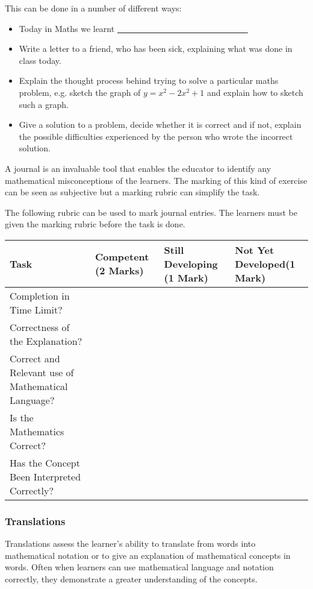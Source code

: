 This can be done in a number of different ways:
\begin{itemize}[noitemsep]
\item Today in Maths we learnt \underline{~~~~~~~~~~~~~~~~~~~~~~~~~~~~~~~} 
\item Write a letter to a friend, who has been sick, explaining what was done in class today.
\item Explain the thought process behind trying to solve a particular maths problem, e.g. sketch the graph of $ y = x^2 - 2x^2 + 1$ and explain how to sketch such a graph.
\item Give a solution to a problem, decide whether it is correct and if not, explain the possible difficulties experienced by the person who wrote the incorrect solution. 
\end{itemize}
A journal is an invaluable tool that enables the educator to identify any mathematical misconceptions of the learners. The marking of this kind of exercise can be seen as subjective but a marking rubric can simplify the task. 

The following rubric can be used to mark journal entries. The learners must be given the marking rubric before the task is done. 
\begin{table}[H]
 \begin{center}
  \begin{tabular}{|p{4cm}|p{2cm}|p{2.5cm}|p{3cm}|} \hline
  \textbf{Task} & \textbf{Competent \newline(2 Marks)} & \textbf{Still Developing \newline(1 Mark)}& \textbf{Not Yet Developed\newline (1 Mark)}\\ \hline
Completion in Time Limit? &&&\\ \hline
Correctness of the Explanation? &&&\\ \hline
Correct and Relevant use of Mathematical Language? &&&\\ \hline
Is the Mathematics Correct? &&&\\ \hline
Has the Concept Been Interpreted Correctly?&&&\\ \hline

  \end{tabular}

 \end{center}

\end{table}


\subsubsection{Translations}
Translations assess the learner’s ability to translate from words into mathematical notation or to give an explanation of mathematical concepts in words. Often when learners can use mathematical language and notation correctly, they demonstrate a greater understanding of the concepts. \par 

